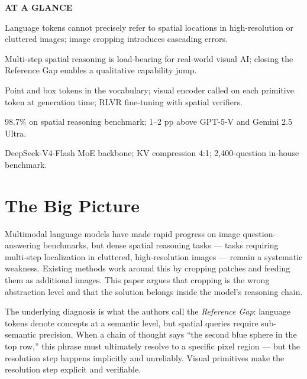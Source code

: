 \documentclass[10pt,twocolumn]{article}
\begin{document}
\begin{mdframed}[backgroundcolor=boxgray,linecolor=rulered,linewidth=1pt,
    innerleftmargin=6pt,innerrightmargin=6pt,
    innertopmargin=6pt,innerbottommargin=6pt]
\textbf{\small AT A GLANCE}\par\vspace{4pt}
\begin{description}[leftmargin=0pt,labelsep=4pt,itemsep=2pt,parsep=0pt,
    font=\small\bfseries]
  \item[Problem:] Language tokens cannot precisely refer to spatial locations in high-resolution or cluttered images; image cropping introduces cascading errors.
  \item[Why it matters:] Multi-step spatial reasoning is load-bearing for real-world visual AI; closing the Reference Gap enables a qualitative capability jump.
  \item[Method:] Point and box tokens in the vocabulary; visual encoder called on each primitive token at generation time; RLVR fine-tuning with spatial verifiers.
  \item[Result:] 98.7\% on spatial reasoning benchmark; 1--2 pp above GPT-5-V and Gemini 2.5 Ultra.
  \item[Evidence:] DeepSeek-V4-Flash MoE backbone; KV compression 4:1; 2,400-question in-house benchmark.
\end{description}
\end{mdframed}

\section{The Big Picture}

Multimodal language models have made rapid progress on image question-answering benchmarks, but dense spatial reasoning tasks --- tasks requiring multi-step localization in cluttered, high-resolution images --- remain a systematic weakness.
Existing methods work around this by cropping patches and feeding them as additional images.
This paper argues that cropping is the wrong abstraction level and that the solution belongs inside the model's reasoning chain.

The underlying diagnosis is what the authors call the \emph{Reference Gap}: language tokens denote concepts at a semantic level, but spatial queries require sub-semantic precision.
When a chain of thought says ``the second blue sphere in the top row,'' this phrase must ultimately resolve to a specific pixel region --- but the resolution step happens implicitly and unreliably.
Visual primitives make the resolution step explicit and verifiable.
\end{document}
